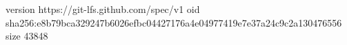 version https://git-lfs.github.com/spec/v1
oid sha256:e8b79bca329247b6026efbc04427176a4e04977419e7e37a24c9c2a130476556
size 43848
